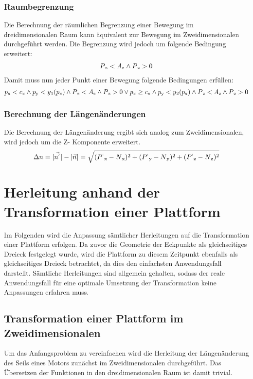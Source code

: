 \documentclass[a4paper, 12pt]{article}
\begin{document}
			\subsubsection{Raumbegrenzung}
			Die Berechnung der räumlichen Begrenzung einer Bewegung im dreidimensionalen Raum kann äquivalent zur Bewegung im Zweidimensionalen durchgeführt werden. Die Begrenzung wird jedoch um folgende Bedingung erweitert:
			\begin{align}
			P\textsubscript{z}<A\textsubscript{z}\land P\textsubscript{z}>0
			\end{align}
			Damit muss nun jeder Punkt einer Bewegung folgende Bedingungen erfüllen:
			\begin{align}
			p\textsubscript{x}<c\textsubscript{x} 
			\land 	p\textsubscript{y}<y\textsubscript{1}(p\textsubscript{x})
			\land	P\textsubscript{z}<A\textsubscript{z}
			\land 	P\textsubscript{z}>0 
			\lor
			p\textsubscript{x} \geq c\textsubscript{x} 
			\land 	p\textsubscript{y}<y\textsubscript{2}(p\textsubscript{x})
			\land	P\textsubscript{z}<A\textsubscript{z}
			\land 	P\textsubscript{z}>0
			\end{align}
			\subsubsection{Berechnung der Längenänderungen}
			Die Berechnung der Längenänderung ergibt sich analog zum Zweidimensionalen, wird jedoch um die Z- Komponente erweitert.
			\begin{align}
			\Delta n =
			|\vec{n^{'}}|-|\vec{n}|=
			\sqrt{
				(P^{`}\textsubscript{x}-N\textsubscript{x})^2+
				(P^{`}\textsubscript{y}-N\textsubscript{y})^2+
				(P^{`}\textsubscript{z}-N\textsubscript{z})^2
			}
			\end{align}	
			\pagebreak
	\section{Herleitung anhand der Transformation einer Plattform}
		Im Folgenden wird die Anpassung sämtlicher Herleitungen auf die Transformation einer Plattform erfolgen. Da zuvor die Geometrie der Eckpunkte als gleichseitiges Dreieck festgelegt wurde, wird die Plattform zu diesem Zeitpunkt ebenfalls als gleichseitiges Dreieck betrachtet, da dies den einfachsten Anwendungsfall darstellt. Sämtliche Herleitungen sind allgemein gehalten, sodass der reale Anwendungsfall für eine optimale Umsetzung der Transformation keine Anpassungen erfahren muss.
		\subsection{Transformation einer Plattform im Zweidimensionalen}
		Um das Anfangsproblem zu vereinfachen wird die Herleitung der Längenänderung des Seils eines Motors zunächst im Zweidimensionalen durchgeführt. Das Übersetzen der Funktionen in den dreidimensionalen Raum ist damit trivial.
		\pagebreak
\end{document}
